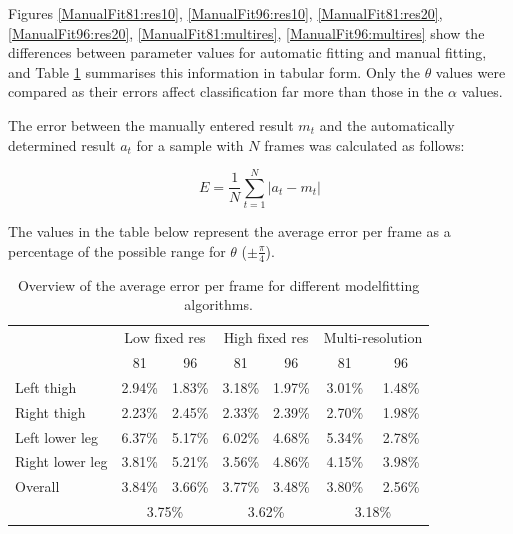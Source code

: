 Figures \ref{ManualFit81:res10}, \ref{ManualFit96:res10}, \ref{ManualFit81:res20}, \ref{ManualFit96:res20}, \ref{ManualFit81:multires}, \ref{ManualFit96:multires} show the differences between parameter values for automatic fitting and manual fitting,
and Table \ref{ManualFitTable} summarises this information in tabular form.
Only the $\theta$ values were compared as their errors affect classification far more than those in the $\alpha$ values.

The error between the manually entered result $m_t$ and the automatically determined result $a_t$ for a sample with $N$ frames was calculated as follows:

\begin{equation}
	E = \frac{1}{N} \sum_{t=1}^N \left| a_t - m_t \right|
\end{equation}

The values in the table below represent the average error per frame as a percentage of the possible range for $\theta$ ($\pm \frac{\pi}{4}$).

\begin{table}[thb]
	\centering
	\begin{tabular}{l|cc|cc|cc}
		& \multicolumn{2}{|c|}{Low fixed res} & \multicolumn{2}{|c|}{High fixed res} & \multicolumn{2}{|c}{Multi-resolution} \\
		& 81 & 96 & 81 & 96 & 81 & 96 \\
		\hline
		Left thigh & 2.94\% & 1.83\% & 3.18\% & 1.97\% & 3.01\% & 1.48\% \\
		Right thigh & 2.23\% & 2.45\% & 2.33\% & 2.39\% & 2.70\% & 1.98\% \\
		Left lower leg & 6.37\% & 5.17\% & 6.02\% & 4.68\% & 5.34\% & 2.78\% \\
		Right lower leg & 3.81\% & 5.21\% & 3.56\% & 4.86\% & 4.15\% & 3.98\% \\
		\hline
		Overall & 3.84\% & 3.66\% & 3.77\% & 3.48\% & 3.80\% & 2.56\% \\
		& \multicolumn{2}{|c|}{3.75\%} & \multicolumn{2}{|c|}{3.62\%} & \multicolumn{2}{|c}{3.18\%} \\
	\end{tabular}
	\caption{Overview of the average error per frame for different modelfitting algorithms.}
	\label{ManualFitTable}
\end{table}

